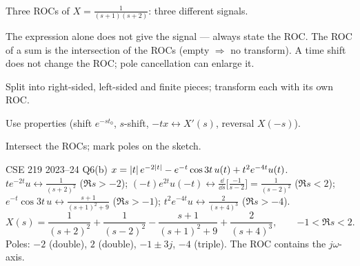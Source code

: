 \begin{center}
\\[-2pt]{\small Three ROCs of $X=\frac1{(s+1)(s+2)}$: three different signals.}
\end{center}
\begin{pitfall}
The expression alone does not give the signal --- always state the ROC. The ROC of a sum is the intersection of the ROCs (empty $\Rightarrow$ no transform). A time shift does not change the ROC; pole cancellation can enlarge it.
\end{pitfall}
\begin{method}
\begin{steps}
\item Split into right-sided, left-sided and finite pieces; transform each with its own ROC.
\item Use properties (shift $e^{-st_0}$, $s$-shift, $-tx\leftrightarrow X'(s)$, reversal $X(-s)$).
\item Intersect the ROCs; mark poles on the sketch.
\end{steps}
\end{method}
\begin{example}{CSE 219 2023--24 Q6(b)}
$x=\lvert t\rvert\,e^{-2\lvert t\rvert}-e^{-t}\cos3t\,u(t)+t^2e^{-4t}u(t)$.\\
$te^{-2t}u\leftrightarrow\frac1{(s+2)^2}$ ($\Re s>-2$); $(-t)e^{2t}u(-t)\leftrightarrow\frac{\dd}{\dd s}\!\big[\tfrac{-1}{s-2}\big]=\frac1{(s-2)^2}$ ($\Re s<2$); $e^{-t}\cos3t\,u\leftrightarrow\frac{s+1}{(s+1)^2+9}$ ($\Re s>-1$); $t^2e^{-4t}u\leftrightarrow\frac2{(s+4)^3}$ ($\Re s>-4$).
\[X(s)=\frac1{(s+2)^2}+\frac1{(s-2)^2}-\frac{s+1}{(s+1)^2+9}+\frac2{(s+4)^3},\qquad\boxed{-1<\Re s<2}.\]
Poles: $-2$ (double), $2$ (double), $-1\pm3j$, $-4$ (triple). The ROC contains the $j\omega$-axis.
\end{example}
